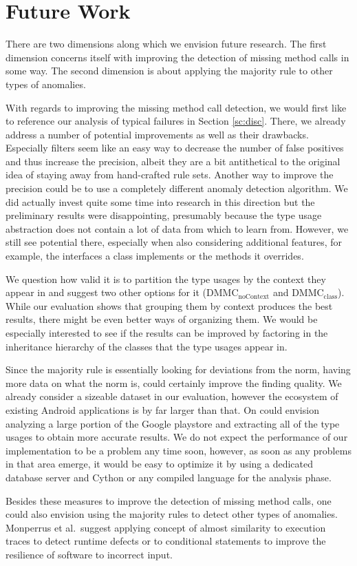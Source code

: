 \section{Future Work}

There are two dimensions along which we envision future research.
The first dimension concerns itself with improving the detection of missing method calls in some way.
The second dimension is about applying the majority rule to other types of anomalies.

With regards to improving the missing method call detection, we would first like to reference our analysis of typical failures in Section \ref{sc:disc}.
There, we already address a number of potential improvements as well as their drawbacks.
Especially filters seem like an easy way to decrease the number of false positives and thus increase the precision, albeit they are a bit antithetical to the original idea of staying away from hand-crafted rule sets.
Another way to improve the precision could be to use a completely different anomaly detection algorithm.
We did actually invest quite some time into research in this direction but the preliminary results were disappointing, presumably because the type usage abstraction does not contain a lot of data from which to learn from.
However, we still see potential there, especially when also considering additional features, for example, the interfaces a class implements or the methods it overrides.

We question how valid it is to partition the type usages by the context they appear in and suggest two other options for it ($\text{DMMC}_\text{noContext}$ and $\text{DMMC}_\text{class}$).
While our evaluation shows that grouping them by context produces the best results, there might be even better ways of organizing them.
We would be especially interested to see if the results can be improved by factoring in the inheritance hierarchy of the classes that the type usages appear in.

Since the majority rule is essentially looking for deviations from the norm, having more data on what the norm is, could certainly improve the finding quality.
We already consider a sizeable dataset in our evaluation, however the ecosystem of existing Android applications is by far larger than that.
On could envision analyzing a large portion of the Google playstore and extracting all of the type usages to obtain more accurate results.
We do not expect the performance of our implementation to be a problem any time soon, however, as soon as any problems in that area emerge, it would be easy to optimize it by using a dedicated database server and Cython or any compiled language for the analysis phase.

Besides these measures to improve the detection of missing method calls, one could also envision using the majority rules to detect other types of anomalies.
Monperrus et al.\ suggest applying concept of almost similarity to execution traces to detect runtime defects or to conditional statements to improve the resilience of software to incorrect input.
